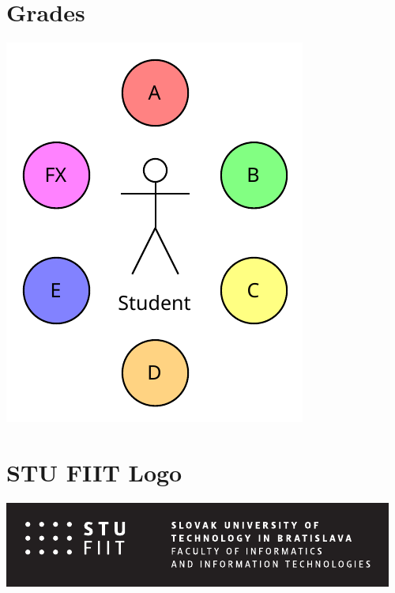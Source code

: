 \documentclass[12pt,english,a4paper]{article}
\begin{document}
\section{Grades}
\begin{center}
    \includegraphics[scale=1,]{Grades.pdf}
\end{center}

\section{STU FIIT Logo}
\begin{center}
    \includegraphics[scale=1.5]{STU-FIIT-Logo.pdf}
\end{center}

\newpage

\printbibliography
\end{document}
